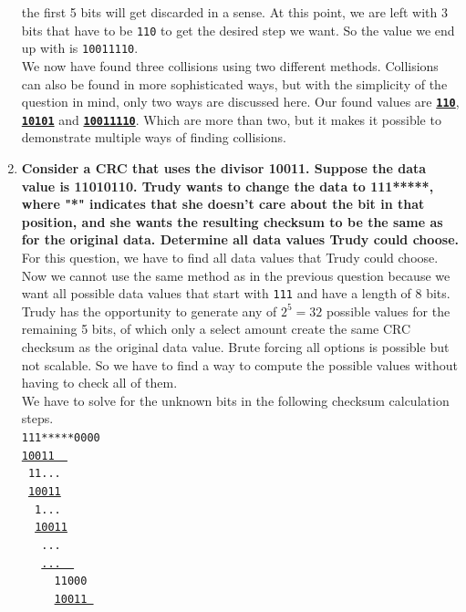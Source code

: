 \documentclass[twoside, a4paper, fleqn, reqno]{article}
\begin{document}
\begin{enumerate}
	the first 5 bits will get discarded in a sense.
	At this point, we are left with 3 bits that have to be \texttt{110} to get the desired step we want.
	So the value we end up with is \texttt{10011110}.\\
	We now have found three collisions using two different methods.
	Collisions can also be found in more sophisticated ways, but with the simplicity of the question
	in mind, only two ways are discussed here. Our found values are
	\textbf{\underline{\texttt{110}}}, \textbf{\underline{\texttt{10101}}} and \textbf{\underline{\texttt{10011110}}}.
	Which are more than two, but it makes it possible to demonstrate multiple ways of finding collisions.
	

	\item\textbf{Consider a CRC that uses the divisor 10011. Suppose the data value
	is 11010110. Trudy wants to change the data to 111*****, where "*"
	indicates that she doesn't care about the bit in that position, and she
	wants the resulting checksum to be the same as for the original data.
	Determine all data values Trudy could choose.}
	For this question, we have to find all data values that Trudy could choose.
	Now we cannot use the same method as in the previous question because we want 
	all possible data values that start with \texttt{111} and have a length of 8 bits.
	Trudy has the opportunity to generate any of $2^5=32$ possible values for the remaining 5 bits,
	of which only a select amount create the same CRC checksum as the original data value.
	Brute forcing all options is possible but not scalable. So we have to find a way to
	compute the possible values without having to check all of them.	
	\\We have to solve for the unknown bits in the following checksum calculation steps.
	\\\texttt{\phantom{}111*****\color{red}0000}
	\\\texttt{\phantom{}\underline{10011~~}~~~~~}
	\\\texttt{\phantom{}~11...~~~~~~~~}
	\\\texttt{\phantom{}~\underline{10011}~~~~~~~~}
	\\\texttt{\phantom{}~~1...~~~~~~~}
	\\\texttt{\phantom{}~~\underline{10011}~~~~~~}
	\\\texttt{\phantom{}~~~...~~~~~~}
	\\\texttt{\phantom{}~~~\underline{...~~}~~~~}
	\\\texttt{\phantom{}~~~~~110\color{red}00~~}
	\\\texttt{\phantom{}~~~~~\underline{100\color{red}11~}~}

\end{enumerate}
\end{document}

